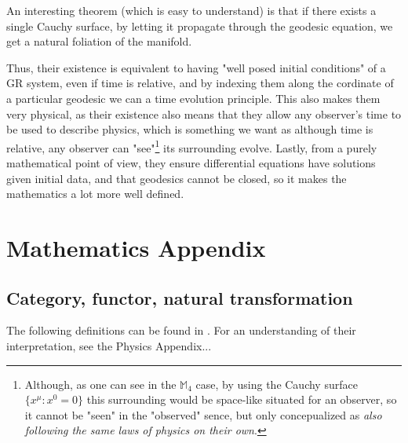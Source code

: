 \documentclass[a4paper,11pt]{article}
\numberwithin{equation}{section}
\theoremstyle{definition}
\begin{document}
    An interesting theorem (which is easy to understand) is that if there exists a single Cauchy surface, by letting it propagate through the geodesic equation, we get a natural foliation of the manifold.

    Thus, their existence is equivalent to having "well posed initial conditions" of a GR system, even if time is relative, and by indexing them along the cordinate of a particular geodesic we can a time evolution principle.
    This also makes them very physical, as their existence also means that they allow any observer's time to be used to describe physics, which is something we want as although time is relative, any observer can "see"\footnote{Although, as one can see in the $\mathbb{M}_4$ case, by using the Cauchy surface $\{x^\mu : x^0= 0\}$ this surrounding would be space-like situated for an observer, so it cannot be "seen" in the "observed" sence, but only concepualized as \emph{also following the same laws of physics on their own}.} its surrounding evolve.
    Lastly, from a purely mathematical point of view, they ensure differential equations have solutions given initial data, and that geodesics cannot be closed, so it makes the mathematics a lot more well defined.
    
\newpage
\section{Mathematics Appendix}
    \subsection{Category, functor, natural transformation} \label{AnMaCat}
    The following definitions can be found in \cite{AlgLang}. For an understanding of their interpretation, see the Physics Appendix...
\end{document}
